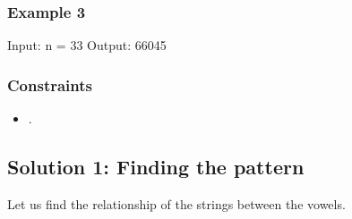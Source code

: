 \documentclass[letterpaper,12pt,english]{book}
\begin{document}
\subsubsection{Example 3}
\label{\detokenize{Mathematics/09_MTH_1641_Count_Sorted_Vowel_Strings:example-3}}
\begin{sphinxVerbatim}[commandchars=\\\{\}]
Input: n = 33
Output: 66045
\end{sphinxVerbatim}


\subsubsection{Constraints}
\label{\detokenize{Mathematics/09_MTH_1641_Count_Sorted_Vowel_Strings:constraints}}\begin{itemize}
\item {} 
\sphinxAtStartPar
{}.

\end{itemize}


\subsection{Solution 1: Finding the pattern}
\label{\detokenize{Mathematics/09_MTH_1641_Count_Sorted_Vowel_Strings:solution-1-finding-the-pattern}}
\sphinxAtStartPar
Let us find the relationship of the strings between the vowels.
\end{document}
